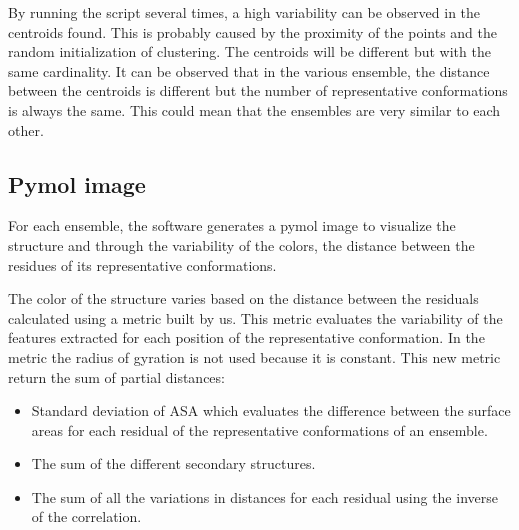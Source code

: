 By running the script several times, a high variability can be observed in the centroids found.
This is probably caused by the proximity of the points and the random initialization of clustering. The centroids will be different but with the same cardinality.
It can be observed that in the various ensemble, the distance between the centroids is different but the number of representative conformations is always the same. This could mean that the ensembles are very similar to each other.



\subsection{Pymol image}
For each ensemble, the software generates a pymol image to visualize the structure and through the variability of the colors, the distance between the residues of its representative conformations.

The color of the structure varies based on the distance between the residuals calculated using a metric built by us. This metric evaluates the variability of the features extracted for each position of the representative conformation. In the metric the radius of gyration is not used because it is constant.
This new metric return the sum of partial distances:
\begin{itemize}
\item Standard deviation of ASA which evaluates the difference between the surface areas for each residual of the representative conformations of an ensemble.
\item The sum of the different secondary structures.
\item The sum of all the variations in distances for each residual using the inverse of the correlation.
\end{itemize}

